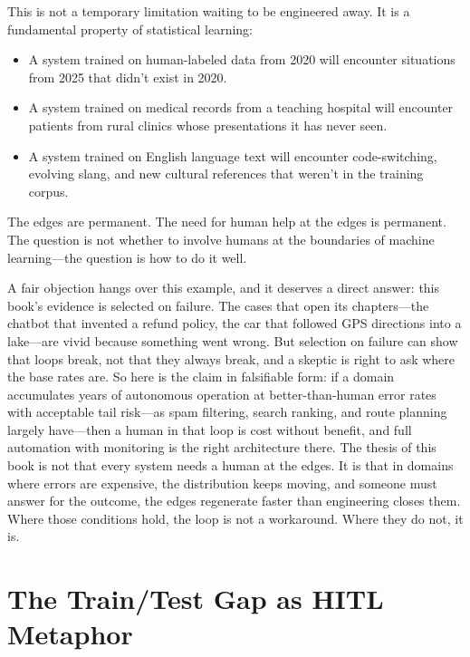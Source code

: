 \begin{examplebox}
This is not a temporary limitation waiting to be engineered away. It is a fundamental property of statistical learning:
\begin{itemize}
    \item A system trained on human-labeled data from 2020 will encounter situations from 2025 that didn't exist in 2020.
    \item A system trained on medical records from a teaching hospital will encounter patients from rural clinics whose presentations it has never seen.
    \item A system trained on English language text will encounter code-switching, evolving slang, and new cultural references that weren't in the training corpus.
\end{itemize}
The edges are permanent. The need for human help at the edges is permanent. The question is not whether to involve humans at the boundaries of machine learning---the question is how to do it well.
\end{examplebox}

A fair objection hangs over this example, and it deserves a direct answer: this book's evidence is selected on failure. The cases that open its chapters---the chatbot that invented a refund policy, the car that followed GPS directions into a lake---are vivid because something went wrong. But selection on failure can show that loops break, not that they always break, and a skeptic is right to ask where the base rates are. So here is the claim in falsifiable form: if a domain accumulates years of autonomous operation at better-than-human error rates with acceptable tail risk---as spam filtering, search ranking, and route planning largely have---then a human in that loop is cost without benefit, and full automation with monitoring is the right architecture there. The thesis of this book is not that every system needs a human at the edges. It is that in domains where errors are expensive, the distribution keeps moving, and someone must answer for the outcome, the edges regenerate faster than engineering closes them. Where those conditions hold, the loop is not a workaround. Where they do not, it is.

\section{The Train/Test Gap as HITL Metaphor}

